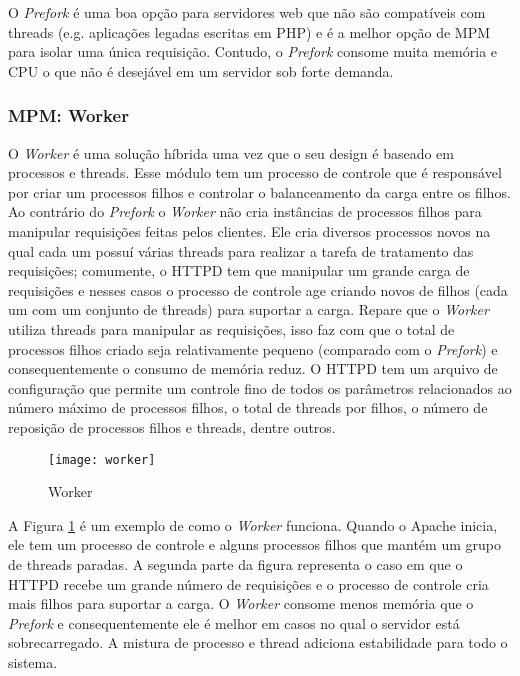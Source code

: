 O \textit{Prefork} é uma boa opção para servidores web que não são compatíveis
com threads (e.g. aplicações legadas escritas em PHP) e é a melhor opção de MPM
para isolar uma única requisição. Contudo, o \textit{Prefork} consome muita
memória e CPU o que não é desejável em um servidor sob forte demanda.

\subsubsection{MPM: Worker}

O \textit{Worker} é uma solução híbrida uma vez que o seu design é baseado em
processos e threads. Esse módulo tem um processo de controle que é responsável
por criar um processos filhos e controlar o balanceamento da carga entre os
filhos. Ao contrário do \textit{Prefork} o \textit{Worker} não cria instâncias
de processos filhos para manipular requisições feitas pelos clientes. Ele cria
diversos processos novos na qual cada um possuí várias threads para realizar a
tarefa de tratamento das requisições; comumente, o HTTPD tem que manipular um
grande carga de requisições e nesses casos o processo de controle age criando
novos de filhos (cada um com um conjunto de threads) para suportar a carga.
Repare que o \textit{Worker} utiliza threads para manipular as requisições,
isso faz com que o total de processos filhos criado seja relativamente pequeno
(comparado com o \textit{Prefork}) e consequentemente o consumo de memória
reduz. O HTTPD tem um arquivo de configuração que permite um controle fino de
todos os parâmetros relacionados ao número máximo de processos filhos, o total
de threads por filhos, o número de reposição de processos filhos e threads,
dentre outros.

\begin{figure}[!h]
  \centering
  \texttt{[image: worker]} 
  \caption{Worker}
  \label{fig:worker} 
\end{figure}

A Figura \ref{fig:worker} é um exemplo de como o \textit{Worker} funciona.
Quando o Apache inicia, ele tem um processo de controle e alguns processos
filhos que mantém um grupo de threads paradas. A segunda parte da figura
representa o caso em que o HTTPD recebe um grande número de requisições e o
processo de controle cria mais filhos para suportar a carga. O \textit{Worker}
consome menos memória que o \textit{Prefork} e consequentemente ele é melhor em
casos no qual o servidor está sobrecarregado.  A mistura de processo e thread
adiciona estabilidade para todo o sistema.

